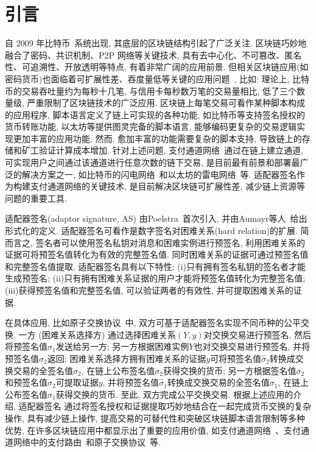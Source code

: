 \documentclass[review]{jcr}
\begin{document}

\section{引言}
自 2009 年比特币~\cite{Nak08}系统出现, 其底层的区块链结构引起了广泛关注. 区块链巧妙地融合了密码、共识机制、P2P 网络等关键技术, 具有去中心化、不可篡改、匿名性、可追溯性、开放透明等特点, 有着非常广阔的应用前景. 但相关区块链应用(如密码货币)也面临着可扩展性差、吞度量低等关键的应用问题~\cite{BanoSAAMMD19,GudgeonMRMG19,ZamyatinAZKMKK19,AumayrEEFHMMR20,SG2018}, 比如: 理论上, 比特币的交易吞吐量约为每秒十几笔, 与信用卡每秒数万笔的交易量相比, 低了三个数量级, 严重限制了区块链技术的广泛应用. 区块链上每笔交易可看作某种脚本构成的应用程序, 脚本语言定义了链上可实现的各种功能, 如比特币等支持签名授权的货币转账功能, 以太坊等提供图灵完备的脚本语言, 能够编码更复杂的交易逻辑实现更加丰富的应用功能. 然而, 愈加丰富的功能需要复杂的脚本支持, 导致链上的存储和矿工验证计算成本增加. 针对上述问题, 支付通道网络~\cite{PC2018}通过在链上建立通道, 可实现用户之间通过该通道进行任意次数的链下交易, 是目前最有前景和部署最广泛的解决方案之一, 如比特币的闪电网络~\cite{PD2016}和以太坊的雷电网络~\cite{raidEX}等. 适配器签名作为构建支付通道网络的关键技术, 是目前解决区块链可扩展性差, 减少链上资源等问题的重要工具. 

适配器签名(adaptor signature, AS) 由Poelstra~\cite{Poelstra2016}首次引入, 并由Aumayr等人~\cite{AumayrEEFHMMR20}给出形式化的定义. 适配器签名可看作是数字签名对困难关系(hard relation)的扩展. 简而言之, 签名者可以使用签名私钥对消息和困难实例进行预签名, 利用困难关系的证据可将预签名值转化为有效的完整签名值. 同时困难关系的证据可通过预签名值和完整签名值提取. 适配器签名具有以下特性: (i)只有拥有签名私钥的签名者才能生成预签名; (ii)只有拥有困难关系证据的用户才能将预签名值转化为完整签名值; (iii)获得预签名值和完整签名值, 可以验证两者的有效性, 并可提取困难关系的证据. 

在具体应用, 比如原子交换协议~\cite{Nolan2013,Poelstra2017,DeshpandeH20,Gugger20}中, 双方可基于适配器签名实现不同币种的公平交换. 一方 (困难关系选择方) 通过选择困难关系$(Y,y)$对交换交易进行预签名, 然后将预签名值$\hat{\sigma}_1$发送给另一方; 另一方根据困难实例$Y$也对交换交易进行预签名, 并将预签名值$\hat{\sigma}_2$返回;  困难关系选择方拥有困难关系的证据$y$可将预签名值$\hat{\sigma}_2$转换成交换交易的全签名值$\sigma_2$, 在链上公布签名值$\sigma_2$获得交换的货币; 另一方根据签名值$\sigma_2$和预签名值$\hat{\sigma}_2$可提取证据$y$, 并将预签名值$\hat{\sigma}_1$转换成交换交易的全签名值$\sigma_1$, 在链上公布签名值$\sigma_1$获得交换的货币. 至此, 双方完成公平交换交易. 根据上述应用的介绍, 适配器签名
通过将签名授权和证据提取巧妙地结合在一起完成货币交换的复杂操作, 具有减少链上操作, 提高交易的可替代性和突破区块链脚本语言限制等多种优势, 在许多区块链应用中都显示出了重要的应用价值, 如支付通道网络~\cite{DeckerW15,PC2018,AumayrEEFHMMR20}、支付通道网络中的支付路由~\cite{EckeyFHR20,MalavoltaMSKM19,MillerBBKM19}和原子交换协议~\cite{Nolan2013,Poelstra2017,DeshpandeH20,Gugger20}等. 
\end{document}
